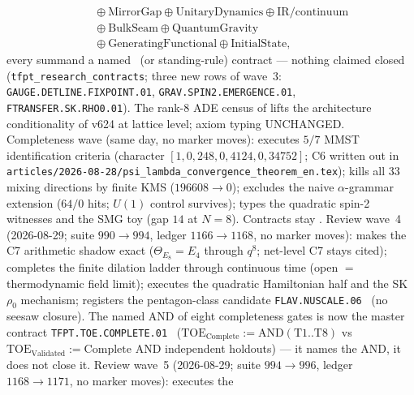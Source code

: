\documentclass[11pt,a4paper]{article}
\begin{document}
\begin{keybox}
\[\begin{aligned}
    &\quad\oplus\mathrm{MirrorGap}\oplus\mathrm{UnitaryDynamics}\oplus\mathrm{IR/continuum}\\
    &\quad\oplus\mathrm{BulkSeam}\oplus\mathrm{QuantumGravity}\\
    &\quad\oplus\mathrm{GeneratingFunctional}\oplus\mathrm{InitialState},
  \end{aligned}
\]
every summand a named \mO\ (or standing-rule) contract --- nothing claimed closed
(\texttt{tfpt\_research\_contracts}; three new rows of wave~3:
\texttt{GAUGE.DETLINE.FIXPOINT.01}, \texttt{GRAV.SPIN2.EMERGENCE.01},
\texttt{FTRANSFER.SK.RHO0.01}).  The rank-8 ADE census of
 lifts the
architecture conditionality of v624 at lattice level; axiom typing UNCHANGED.
Completeness wave (same day, no marker moves):
 executes $5/7$ MMST identification criteria
(character $[1,0,248,0,4124,0,34752]$; C6 written out in
\texttt{articles/2026-08-28/psi\_lambda\_convergence\_theorem\_en.tex});
 kills all $33$ mixing directions by finite KMS
($196608\to 0$);
 excludes the naive $\alpha$-grammar extension
($64/0$ hits; $U(1)$ control survives);
 types the quadratic spin-2 witnesses and the SMG toy
(gap $14$ at $N=8$).  Contracts stay \mO.
Review wave~4 (2026-08-29; suite $990\to994$, ledger $1166\to1168$, no marker moves):
 makes the C7
arithmetic shadow exact ($\Theta_{E_8}=E_4$ through $q^8$; net-level C7 stays cited);
 completes the finite
dilation ladder through continuous time (open $=$ thermodynamic field limit);
 executes the
quadratic Hamiltonian half and the SK $\rho_0$ mechanism;
 registers the
pentagon-class candidate \texttt{FLAV.NUSCALE.06} \mC\ (no seesaw closure).
The named AND of eight completeness gates is now the master contract
\texttt{TFPT.TOE.COMPLETE.01} \mO\
($\mathrm{TOE}_{\mathrm{Complete}}:=\mathrm{AND}(\mathrm{T1}{..}\mathrm{T8})$ vs
$\mathrm{TOE}_{\mathrm{Validated}}:=\mathrm{Complete}$ AND independent holdouts) --- it
names the AND, it does not close it.
Review wave~5 (2026-08-29; suite $994\to996$, ledger $1168\to1171$, no marker moves):
\veri{v1002\_\allowbreak spin10\_\allowbreak mirror\_\allowbreak projector.py} executes the

\end{keybox}
\end{document}
